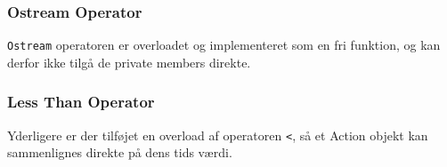 \subsubsection{Ostream Operator}

\texttt{Ostream} operatoren er overloadet og implementeret som en fri funktion, og kan derfor ikke tilgå de private members direkte.

\subsubsection{Less Than Operator}

Yderligere er der tilføjet en overload af operatoren \texttt{<}, så et Action objekt kan sammenlignes direkte på dens tids værdi.

\clearpage